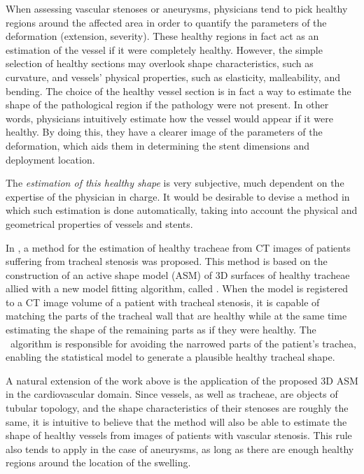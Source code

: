 \challenge
When assessing vascular stenoses or aneurysms, physicians tend to pick healthy regions around the affected area in order to quantify the parameters of the deformation (extension, severity). These healthy regions in fact act as an estimation of the vessel if it were completely healthy. However, the simple selection of healthy sections may overlook shape characteristics, such as curvature, and vessels' physical properties, such as elasticity, malleability, and bending. The choice of the healthy vessel section is in fact a way to estimate the shape of the pathological region if the pathology were not present. In other words, physicians intuitively estimate how the vessel would appear if it were healthy. By doing this, they have a clearer image of the parameters of the deformation, which aids them in determining the stent dimensions and deployment location.

The {\em estimation of this healthy shape} is very subjective, much dependent on the expertise of the physician in charge. It would be desirable to devise a method in which such estimation is done automatically, taking into account the physical and geometrical properties of vessels and stents.

\approach
In \citep{Pinho:Trachea4}, a method for the estimation of healthy tracheae from CT images of patients suffering from tracheal stenosis was proposed. This method is based on the construction of an active shape model (ASM) \citep{Cootes} of 3D surfaces of healthy tracheae allied with a new model fitting algorithm, called \fixedland. When the model is registered to a CT image volume of a patient with tracheal stenosis, it is capable of matching the parts of the tracheal wall that are healthy while at the same time estimating the shape of the remaining parts as if they were healthy. The \fixedland\ algorithm is responsible for avoiding the narrowed parts of the patient's trachea, enabling the statistical model to generate a plausible healthy tracheal shape.

A natural extension of the work above is the application of the proposed 3D ASM in the cardiovascular domain. Since vessels, as well as tracheae, are objects of tubular topology, and the shape characteristics of their stenoses are roughly the same, it is intuitive to believe that the method will also be able to estimate the shape of healthy vessels from images of patients with vascular stenosis. This rule also tends to apply in the case of aneurysms, as long as there are enough healthy regions around the location of the swelling.

